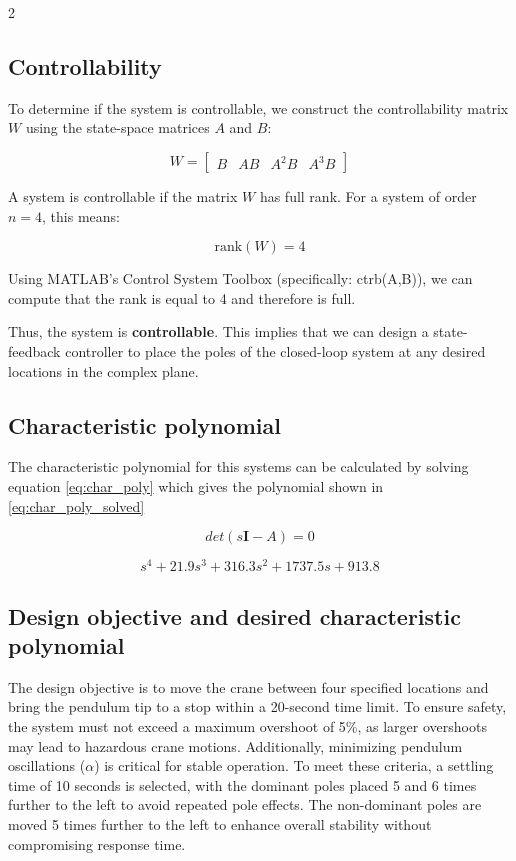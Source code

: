 \documentclass[12pt]{article}
\begin{document}
\begin{multicols}{2}
    

\subsection{Controllability}

To determine if the system is controllable, we construct the controllability matrix \( W \) using the state-space matrices \( A \) and \( B \):

\begin{equation}
W = \begin{bmatrix} B & AB & A^2B & A^3B \end{bmatrix}
\end{equation}

A system is controllable if the matrix \( W \) has full rank. For a system of order \( n = 4 \), this means:

\begin{equation}
\text{rank}(W) = 4
\end{equation}

Using MATLAB’s Control System Toolbox (specifically: ctrb(A,B)), we can compute that the rank is equal to 4 and therefore is full.

Thus, the system is \textbf{controllable}. This implies that we can design a state-feedback controller to place the poles of the closed-loop system at any desired locations in the complex plane.


\subsection{Characteristic polynomial}
The characteristic polynomial for this systems can be calculated by solving equation \ref{eq:char_poly} which gives the polynomial shown in \ref{eq:char_poly_solved}

\begin{equation}
    det(s\textbf{I}-A)=0
    \label{eq:char_poly}
\end{equation}

\begin{equation}
    s^4 + 21.9s^3 + 316.3s^2 + 1737.5s + 913.8
    \label{eq:char_poly_solved}
\end{equation}
\subsection{Design objective and desired characteristic polynomial}
The design objective is to move the crane between four specified locations and bring the pendulum tip to a stop within a 20-second time limit. To ensure safety, the system must not exceed a maximum overshoot of 5\%, as larger overshoots may lead to hazardous crane motions. Additionally, minimizing pendulum oscillations ($\alpha$) is critical for stable operation. To meet these criteria, a settling time of 10 seconds is selected, with the dominant poles placed 5 and 6 times further to the left to avoid repeated pole effects. The non-dominant poles are moved 5 times further to the left to enhance overall stability without compromising response time.



\end{multicols}
\end{document}
